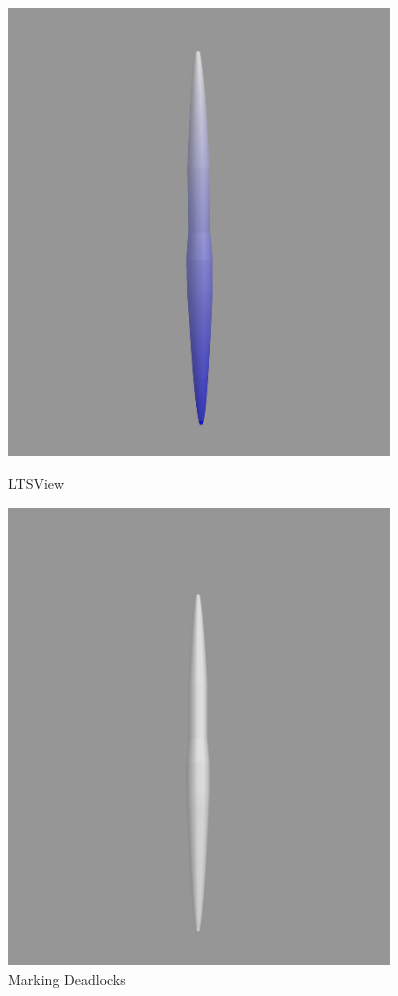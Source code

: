 \documentclass[a4paper,12pt]{article}
\begin{document}
\begin{figure}[ht]
    \centering
    \begin{minipage}{0.45\textwidth}
        \centering
        \includegraphics[width=0.9\textwidth]{3D-Model.png} \caption{LTSView}
        \label{fig:ltsview-1}
    \end{minipage}\hfill
    \begin{minipage}{0.45\textwidth}
        \centering
        \includegraphics[width=0.9\textwidth]{Deadlockfree.png} 
        \caption{Marking Deadlocks}
        \label{fig:deadlockfree}
    \end{minipage}
\end{figure}
\newpage
\end{document}
